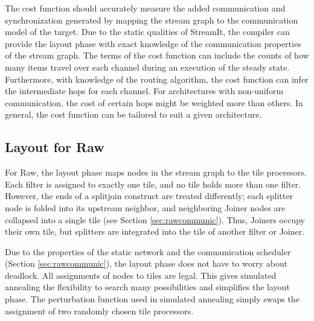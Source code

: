 
The cost function should accurately measure the added communication
and synchronization generated by mapping the stream graph to the
communication model of the target.  Due to the static qualities of
StreamIt, the compiler can provide the layout phase with exact
knowledge of the communication properties of the stream graph.  The
terms of the cost function can include the counts of how many items
travel over each channel during an execution of the steady state.
Furthermore, with knowledge of the routing algorithm, the cost
function can infer the intermediate hops for each channel.  For
architectures with non-uniform communication, the cost of certain hops
might be weighted more than others.  In general, the cost function can
be tailored to suit a given architecture.



\subsection{Layout for Raw}

For Raw, the layout phase maps nodes in the stream graph to the tile
processors.  Each filter is assigned to exactly one tile, and no tile
holds more than one filter.  However, the ends of a splitjoin
construct are treated differently; each splitter node is folded into
its upstream neighbor, and neighboring Joiner nodes are collapsed into
a single tile (see Section \ref{sec:rawcommunic}).  Thus, Joiners
occupy their own tile, but splitters are integrated into the tile of
another filter or Joiner.

Due to the properties of the static network and the communication
scheduler (Section \ref{sec:rawcommunic}), the layout phase does not
have to worry about deadlock.  All assignments of nodes to tiles are
legal.  This gives simulated annealing the flexibility to search many
possibilities and simplifies the layout phase.  The perturbation
function used in simulated annealing simply swaps the assignment of
two randomly chosen tile processors.

